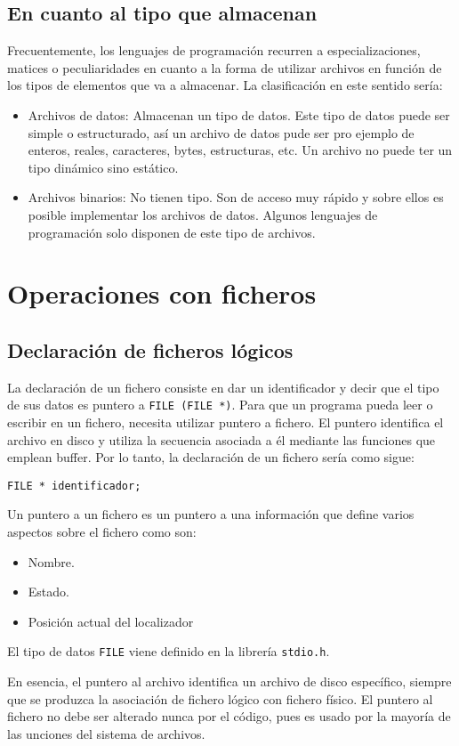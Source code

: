 \subsection{En cuanto al tipo que almacenan}{
Frecuentemente, los lenguajes de programación recurren a especializaciones, matices o peculiaridades en cuanto a la forma de utilizar archivos en función de los tipos de elementos que va a almacenar. La clasificación en este sentido sería:
\begin{itemize}
	\item Archivos de datos: Almacenan un tipo de datos. Este tipo de datos puede ser simple o estructurado, así un archivo de datos pude ser pro ejemplo de enteros, reales, caracteres, bytes, estructuras, etc. Un archivo no puede ter un tipo dinámico sino estático.
	\item Archivos binarios: No tienen tipo. Son de acceso muy rápido y sobre ellos es posible implementar los archivos de datos. Algunos lenguajes de programación solo disponen de este tipo de archivos.
\end{itemize}
}
\section{Operaciones con ficheros}
\subsection{Declaración de ficheros lógicos}{
La declaración de un fichero consiste en dar un identificador y decir que el tipo de sus datos es puntero a \texttt{FILE (FILE *)}. Para que un programa pueda leer o escribir en un fichero, necesita utilizar puntero a fichero. El puntero identifica el archivo en disco y utiliza la secuencia asociada a él mediante las funciones que emplean buffer. Por lo tanto, la declaración de un fichero sería como sigue:

\texttt{FILE * identificador;}

Un puntero a un fichero es un puntero a una información que define varios aspectos sobre el fichero como son:
\begin{itemize}
	\item Nombre.
	\item Estado.
	\item Posición actual del localizador
\end{itemize}
El tipo de datos \texttt{FILE} viene definido en la librería \texttt{stdio.h}.

En esencia, el puntero al archivo identifica un archivo de disco específico, siempre que se  produzca la asociación de fichero lógico con fichero físico. El puntero al fichero no debe ser alterado nunca por el código, pues es usado por la mayoría de las  unciones del sistema de archivos.
}
